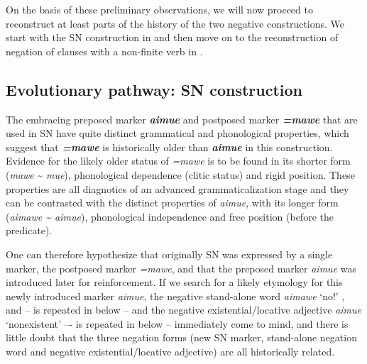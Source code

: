 \documentclass[output=paper]{langsci/langscibook}
\begin{document}
On the basis of these preliminary observations, we will now proceed to
reconstruct at least parts of the history of the two negative
constructions. We start with the SN construction in
 and then move on to the reconstruction of
negation of clauses with a non-finite verb in .

\subsection{Evolutionary pathway: SN construction}\label{sec:tacana-10.1}

The embracing preposed marker \textbf{\textit{aimue}} and postposed marker
\textbf{\textit{=mawe}} that are used in SN have quite distinct grammatical
and phonological properties, which suggest that \textbf{\textit{=mawe}} is historically older than \textbf{\textit{aimue}} in this construction. Evidence for the likely older status of \textit{=mawe} is to be found in its shorter form (\textit{mawe} {\textasciitilde} \textit{mue}), phonological dependence (clitic status) and rigid position. These properties are all diagnotics of an advanced grammaticalization stage and they can be contrasted with the distinct properties of \textit{aimue}, with its longer form (\textit{aimawe {\textasciitilde} aimue}), phonological independence and free position (before the predicate).

One can therefore hypothesize that originally SN was expressed by a
single marker, the postposed marker \textit{=mawe}, and that the preposed
marker \textit{aimue} was introduced later for reinforcement. If we search
for a likely etymology for this newly introduced marker \textit{aimue}, the
negative stand-alone word \textit{aimawe} `no!'
,  and
 --  is repeated in
 below -- and the negative
existential\slash locative adjective \textit{aimue} `nonexistent'
 –-  is repeated in
 below – immediately come to mind, and there is little doubt that the three negation forms (new SN marker, stand-alone negation word and negative existential\slash locative adjective) are all historically related.
\end{document}
